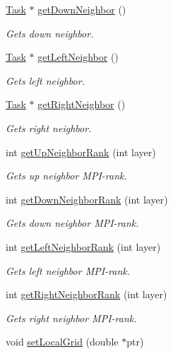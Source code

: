 \begin{DoxyCompactItemize}
\hyperlink{classTask}{Task} $\ast$ \hyperlink{classTask_ac7e5e11d3e7d6727018c43f3e07e79bb}{get\+Down\+Neighbor} ()
\begin{DoxyCompactList}\small\item\em Gets down neighbor. \end{DoxyCompactList}\item 
\hyperlink{classTask}{Task} $\ast$ \hyperlink{classTask_ae1f4ba255872d478311c089b6151feb5}{get\+Left\+Neighbor} ()
\begin{DoxyCompactList}\small\item\em Gets left neighbor. \end{DoxyCompactList}\item 
\hyperlink{classTask}{Task} $\ast$ \hyperlink{classTask_a7afe74dcbb7854a65a7c52663eaf1549}{get\+Right\+Neighbor} ()
\begin{DoxyCompactList}\small\item\em Gets right neighbor. \end{DoxyCompactList}\item 
int \hyperlink{classTask_af44ae2ab1b630b8d428beaa7484b9a82}{get\+Up\+Neighbor\+Rank} (int layer)
\begin{DoxyCompactList}\small\item\em Gets up neighbor M\+P\+I-\/rank. \end{DoxyCompactList}\item 
int \hyperlink{classTask_aad60be81222911c2398ebeabf728347a}{get\+Down\+Neighbor\+Rank} (int layer)
\begin{DoxyCompactList}\small\item\em Gets down neighbor M\+P\+I-\/rank. \end{DoxyCompactList}\item 
int \hyperlink{classTask_a08bdbf00f430a36a014cde2c72e71f4c}{get\+Left\+Neighbor\+Rank} (int layer)
\begin{DoxyCompactList}\small\item\em Gets left neighbor M\+P\+I-\/rank. \end{DoxyCompactList}\item 
int \hyperlink{classTask_ae40c37d095e1aa66a17b56e0c71fbb7d}{get\+Right\+Neighbor\+Rank} (int layer)
\begin{DoxyCompactList}\small\item\em Gets right neighbor M\+P\+I-\/rank. \end{DoxyCompactList}\item 
void \hyperlink{classTask_a27f98878370d88af464d77e7ba17eda0}{set\+Local\+Grid} (double $\ast$ptr)

\end{DoxyCompactItemize}
